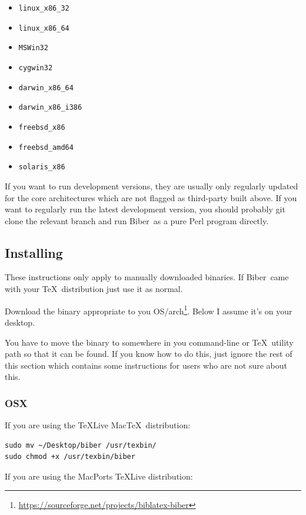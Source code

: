 \documentclass{ltxdockit}
\newcommand*{\biber}{Biber\xspace}
\begin{document}
\begin{itemize}
\item \verb+linux_x86_32+
\item \verb+linux_x86_64+
\item \verb+MSWin32+
\item \verb+cygwin32+
\item \verb+darwin_x86_64+
\item \verb+darwin_x86_i386+
\item \verb+freebsd_x86+\tpb
\item \verb+freebsd_amd64+\tpb
\item \verb+solaris_x86+\tpb
\end{itemize}

\noindent If you want to run development versions, they are usually only
regularly updated for the core architectures which are not flagged as
third-party built above. If you want to regularly run the latest
development version, you should probably git clone the relevant branch and
run \biber\ as a pure Perl program directly.

\subsection{Installing}

These instructions only apply to manually downloaded binaries. If
\biber\ came with your \TeX\ distribution just use it as normal.

Download the binary appropriate to you
OS/arch\footnote{\url{https://sourceforge.net/projects/biblatex-biber}}. Below
I assume it's on your desktop.

You have to move the binary to somewhere in you command-line or \TeX\ utility
path so that it can be found. If you know how to do this, just ignore the
rest of this section which contains some instructions for users who are
not sure about this.

\subsubsection{OSX}

If you are using the \TeX Live Mac\TeX\ distribution:

\begin{verbatim}
sudo mv ~/Desktop/biber /usr/texbin/
sudo chmod +x /usr/texbin/biber
\end{verbatim}

\noindent If you are using the MacPorts \TeX Live distribution:
\end{document}
